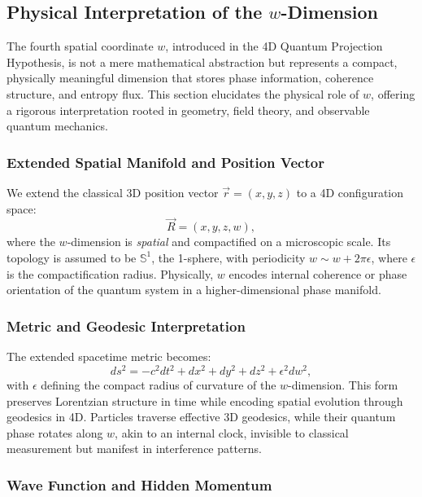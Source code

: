 \documentclass[12pt]{article}
\begin{document}
\subsection{Physical Interpretation of the \(w\)-Dimension}
\label{subsec:w_dimension}

The fourth spatial coordinate \(w\), introduced in the 4D Quantum Projection Hypothesis, is not a mere mathematical abstraction but represents a compact, physically meaningful dimension that stores phase information, coherence structure, and entropy flux. This section elucidates the physical role of \(w\), offering a rigorous interpretation rooted in geometry, field theory, and observable quantum mechanics.

\subsubsection*{Extended Spatial Manifold and Position Vector}

We extend the classical 3D position vector \(\vec{r} = (x, y, z)\) to a 4D configuration space:
\begin{equation}
\vec{R} = (x, y, z, w),
\label{eq:position_vector_4d}
\end{equation}
where the \(w\)-dimension is \emph{spatial} and compactified on a microscopic scale. Its topology is assumed to be \(\mathbb{S}^1\), the 1-sphere, with periodicity \(w \sim w + 2\pi \epsilon\), where \(\epsilon\) is the compactification radius. Physically, \(w\) encodes internal coherence or phase orientation of the quantum system in a higher-dimensional phase manifold.

\subsubsection*{Metric and Geodesic Interpretation}

The extended spacetime metric becomes:
\begin{equation}
ds^2 = -c^2 dt^2 + dx^2 + dy^2 + dz^2 + \epsilon^2 dw^2,
\label{eq:metric_with_w}
\end{equation}
with \(\epsilon\) defining the compact radius of curvature of the \(w\)-dimension. This form preserves Lorentzian structure in time while encoding spatial evolution through geodesics in 4D. Particles traverse effective 3D geodesics, while their quantum phase rotates along \(w\), akin to an internal clock, invisible to classical measurement but manifest in interference patterns.

\subsubsection*{Wave Function and Hidden Momentum}
\end{document}
